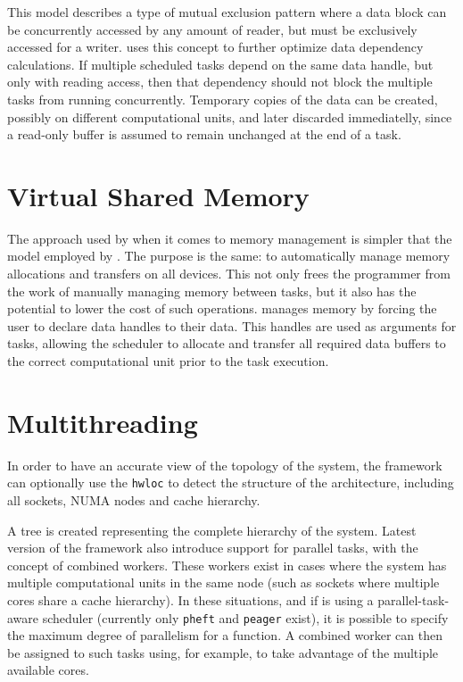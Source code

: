 \documentclass[main.tex]{subfiles}
\begin{document}
This model describes a type of mutual exclusion pattern where a data block can be concurrently accessed by any amount of reader, but must be exclusively accessed for a writer. \starpu uses this concept to further optimize data dependency calculations. If multiple scheduled tasks depend on the same data handle, but only with reading access, then that dependency should not block the multiple tasks from running concurrently. Temporary copies of the data can be created, possibly on different computational units, and later discarded immediatelly, since a read-only buffer is assumed to remain unchanged at the end of a task.



\section{Virtual Shared Memory}

The approach used by \starpu when it comes to memory management is simpler that the model employed by \gama. The purpose is the same: to automatically manage memory allocations and transfers on all devices. This not only frees the programmer from the work of manually managing memory between tasks, but it also has the potential to lower the cost of such operations.
\starpu manages memory by forcing the user to declare data handles to their data. This handles are used as arguments for tasks, allowing the scheduler to allocate and transfer all required data buffers to the correct computational unit prior to the task execution.


\section{Multithreading} \label{section:starpu_multithreading}

In order to have an accurate view of the topology of the system, the framework can optionally use the \texttt{hwloc} \cite{broquedis2010hwloc} to detect the structure of the architecture, including all \cpu sockets, \acs{NUMA} nodes and cache hierarchy.

A tree is created representing the complete hierarchy of the system. Latest version of the framework also introduce support for parallel tasks, with the concept of combined workers. These workers exist in cases where the system has multiple computational units in the same node (such as \cpu sockets where multiple cores share a cache hierarchy). In these situations, and if \starpu is using a parallel-task-aware scheduler (currently only \texttt{pheft} and \texttt{peager} exist), it is possible to specify the maximum degree of parallelism for a function. A combined worker can then be assigned to such tasks using, for example, \openmp to take advantage of the multiple available cores.
\end{document}
